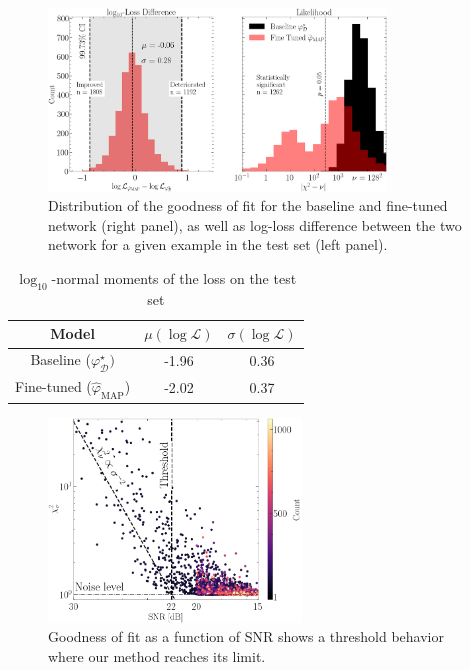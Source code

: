 \begin{figure}[H]
        \centering
        \includegraphics[width=0.8\textwidth]{figures/loss_and_likelihood}
        \caption{Distribution of the goodness of fit for the baseline and fine-tuned network (right panel), as well as log-loss difference between the two network for a given example in the test set (left panel).
}
        \label{fig:loss and chi squared}
\end{figure}



\begin{table}[H]
    \centering
    \caption{$\log_{10}$-normal moments of the loss on the test set}
    \label{tab:loss}
    \begin{tabular}{ccc}
        \hline
          Model  & $\mu(\log \mathcal{L})$ & $\sigma(\log \mathcal{L})$ \\
        \hline \hline
        Baseline ($\varphi_{\mathcal{D}}^\star)$ &  -1.96 & 0.36 \\
        Fine-tuned ($\hat{\varphi}_{\mathrm{MAP}}$) & -2.02 & 0.37 \\\hline
    \end{tabular}

\end{table}



\begin{figure}[H]
        \centering
        \includegraphics[width=0.6\textwidth]{figures/chisq_vs_noise_ewc}
        \caption{Goodness of fit as a function of SNR shows a threshold 
        behavior where our method reaches its limit.}
        \label{fig:chi squared vs noise}
\end{figure}

